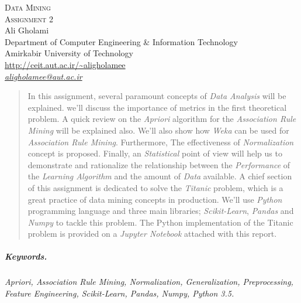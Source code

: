 \documentclass[12pt]{article}
\numberwithin{equation}{section}
\numberwithin{table}{section}
\numberwithin{figure}{section}
\begin{document}

\begin{center}
\textsc{\Huge Data Mining} \\[2pt]
	\textsc{\Large Assignment 2}\\
	\vspace{0.5cm}
  Ali Gholami \\[6pt]
  Department of Computer Engineering \& Information Technology\\
  Amirkabir University of Technology  \\[6pt]
  \def\UrlFont{\em}
  \url{http://ceit.aut.ac.ir/~aligholamee}\\
    \href{mailto:aligholamee@aut.ac.ir}{\textit{aligholamee@aut.ac.ir}}
\end{center}

\begin{abstract}
In this assignment, several paramount concepts of \textit{Data Analysis} will be explained. we'll discuss the importance of metrics in the first theoretical problem. A quick review on the \textit{Apriori} algorithm for the \textit{Association Rule Mining} will be explained also. We'll also show how \textit{Weka} can be used for \textit{Association Rule Mining}. Furthermore, The effectiveness of \textit{Normalization} concept is proposed. Finally, an \textit{Statistical} point of view will help us to demonstrate and rationalize the relationship between the \textit{Performance} of the \textit{Learning Algorithm} and the amount of \textit{Data} available. A chief section of this assignment is dedicated to solve the \textit{Titanic} problem, which is a great practice of data mining concepts in production. We'll use \textit{Python} programming language and three main libraries; \textit{Scikit-Learn}, \textit{Pandas} and \textit{Numpy} to tackle this problem. The Python implementation of the Titanic problem is provided on a \textit{Jupyter Notebook} attached with this report.
\end{abstract} 

\subparagraph{Keywords.} \textit{Apriori, Association Rule Mining, Normalization, Generalization, Preprocessing, Feature Engineering, Scikit-Learn, Pandas, Numpy, Python 3.5.}
\end{document}
